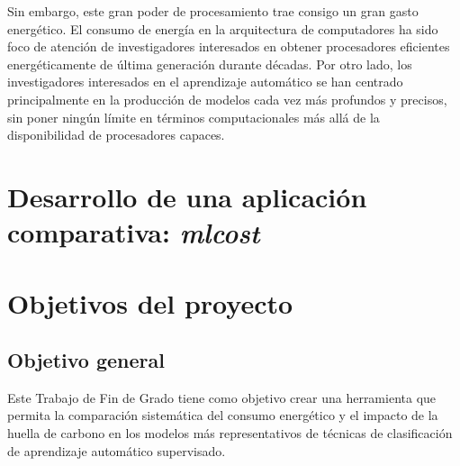Sin embargo, este gran poder de procesamiento trae consigo un gran gasto energético.
El consumo de energía en la arquitectura de computadores ha sido foco de atención de investigadores interesados en obtener procesadores eficientes energéticamente de última generación durante décadas. 
Por otro lado, los investigadores interesados en el aprendizaje automático se han centrado principalmente en la producción de modelos cada vez más profundos y precisos, sin poner ningún límite en términos computacionales más allá de la disponibilidad de procesadores capaces.



\section{Desarrollo de una aplicación comparativa: \emph{mlcost}}




\section{Objetivos del proyecto}
\label{sec:objetivos}

\subsection{Objetivo general} %
\label{sec:objetivo-general} %


Este Trabajo de Fin de Grado tiene como objetivo crear una herramienta que permita la comparación sistemática del consumo energético y el impacto de la huella de carbono en los modelos más representativos de técnicas de clasificación de aprendizaje automático supervisado.


